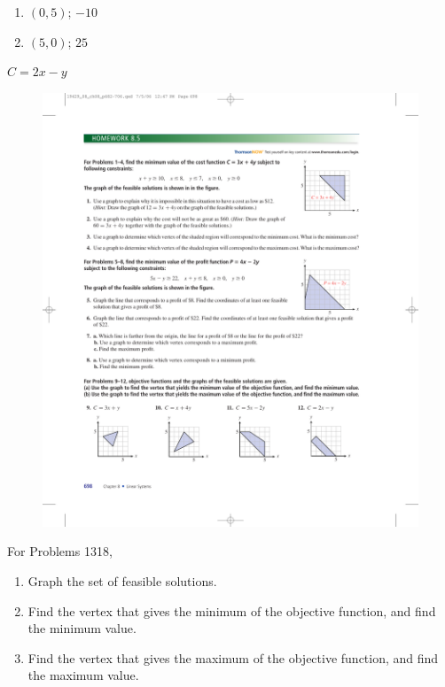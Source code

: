 \documentclass[10pt,]{book}
\theoremstyle{plain}
\theoremstyle{definition}
\theoremstyle{definition}
\theoremstyle{definition}
\numberwithin{equation}{part}
\begin{document}
\begin{exercisegroup}
\leavevmode%
\begin{multicols}{2}
\begin{enumerate}[label=(\alph*)]
\item\hypertarget{li-64}{}\((0,5) \); \(-10\)%
\item\hypertarget{li-65}{}\((5,0) \); \(25\)%
\end{enumerate}
\end{multicols}
%
\exercise[12.]\hypertarget{exercise-16}{}\(C = 2x − y\)\leavevmode%
\begin{figure}
\centering
\includegraphics[width=0.7\linewidth]{images/fig-8-5-12}
\end{figure}
%
\end{exercisegroup}
\par\smallskip\noindent
\hypertarget{exercisegroup-4}{}\par\noindent For Problems 13\textendash{}18,\leavevmode%
\begin{enumerate}[label=(\alph*)]
\item\hypertarget{li-66}{}Graph the set of feasible solutions.%
\item\hypertarget{li-67}{}Find the vertex that gives the minimum of the objective function, and find the minimum value.%
\item\hypertarget{li-68}{}Find the vertex that gives the maximum of the objective function, and find the maximum value.%
\end{enumerate}
%
\end{document}
